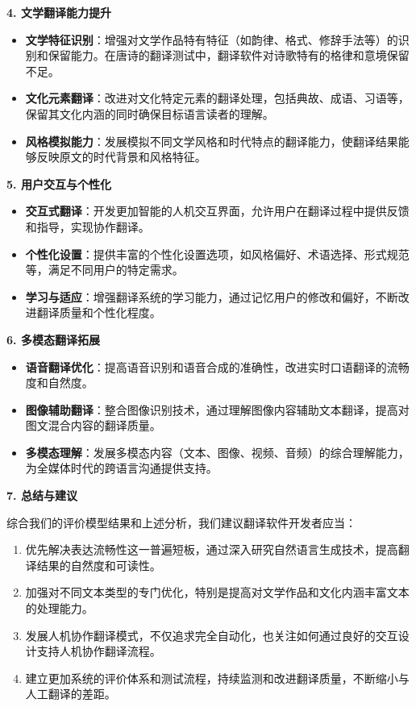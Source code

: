 \documentclass[bwprint]{cumcmthesis}
\begin{document}
\textbf{4. 文学翻译能力提升}

\begin{itemize}
    \item \textbf{文学特征识别}：增强对文学作品特有特征（如韵律、格式、修辞手法等）的识别和保留能力。在唐诗的翻译测试中，翻译软件对诗歌特有的格律和意境保留不足。
    
    \item \textbf{文化元素翻译}：改进对文化特定元素的翻译处理，包括典故、成语、习语等，保留其文化内涵的同时确保目标语言读者的理解。
    
    \item \textbf{风格模拟能力}：发展模拟不同文学风格和时代特点的翻译能力，使翻译结果能够反映原文的时代背景和风格特征。
\end{itemize}

\textbf{5. 用户交互与个性化}

\begin{itemize}
    \item \textbf{交互式翻译}：开发更加智能的人机交互界面，允许用户在翻译过程中提供反馈和指导，实现协作翻译。
    
    \item \textbf{个性化设置}：提供丰富的个性化设置选项，如风格偏好、术语选择、形式规范等，满足不同用户的特定需求。
    
    \item \textbf{学习与适应}：增强翻译系统的学习能力，通过记忆用户的修改和偏好，不断改进翻译质量和个性化程度。
\end{itemize}

\textbf{6. 多模态翻译拓展}

\begin{itemize}
    \item \textbf{语音翻译优化}：提高语音识别和语音合成的准确性，改进实时口语翻译的流畅度和自然度。
    
    \item \textbf{图像辅助翻译}：整合图像识别技术，通过理解图像内容辅助文本翻译，提高对图文混合内容的翻译质量。
    
    \item \textbf{多模态理解}：发展多模态内容（文本、图像、视频、音频）的综合理解能力，为全媒体时代的跨语言沟通提供支持。
\end{itemize}

\textbf{7. 总结与建议}

综合我们的评价模型结果和上述分析，我们建议翻译软件开发者应当：

\begin{enumerate}
    \item 优先解决表达流畅性这一普遍短板，通过深入研究自然语言生成技术，提高翻译结果的自然度和可读性。
    
    \item 加强对不同文本类型的专门优化，特别是提高对文学作品和文化内涵丰富文本的处理能力。
    
    \item 发展人机协作翻译模式，不仅追求完全自动化，也关注如何通过良好的交互设计支持人机协作翻译流程。
    
    \item 建立更加系统的评价体系和测试流程，持续监测和改进翻译质量，不断缩小与人工翻译的差距。
\end{enumerate}
\end{document}
